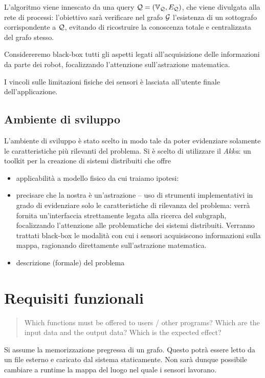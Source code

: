 \documentclass{llncs}
\begin{document}
L'algoritmo viene innescato da una query $\mathcal{Q} = (\mathbb{V}_{\mathcal{Q}}, E_{\mathcal{Q}})$, 
che viene divulgata alla rete di processi: l'obiettivo sarà verificare
nel grafo $\mathcal{G}$ l'esistenza di un sottografo corrispondente a $\mathcal{Q}$,
evitando di ricostruire la conoscenza totale e centralizzata del
grafo stesso.

Considereremo black-box tutti gli aspetti legati all'acquisizione delle informazioni 
da parte dei robot, focalizzando l'attenzione sull'astrazione matematica.

I vincoli sulle limitazioni fisiche dei sensori è lasciata all'utente finale dell'applicazione.
\subsection{Ambiente di sviluppo}
L'ambiente di sviluppo è stato scelto in modo tale da poter evidenziare solamente le caratteristiche più rilevanti del problema. Si è scelto di utilizzare il \emph{Akka}: un toolkit per la creazione di sistemi distribuiti che offre 


\begin{itemize}
\item applicabilità a modello fisico da cui traiamo ipotesi:
\item precisare che la nostra è un'astrazione -- uso di strumenti
  implementativi in grado di evidenziare solo le caratteristiche
  di rilevanza del problema: verrà fornita un'interfaccia strettamente
  legata alla ricerca del subgraph, focalizzando l'attenzione
  alle problematiche dei sistemi distribuiti.
  Verranno trattati black-box le modalità con cui i sensori
  acquisiscono informazioni sulla mappa, ragionando direttamente
  sull'astrazione matematica.
\item descrizione (formale) del problema
\end{itemize}




\section{Requisiti funzionali}
\label{sec:func-req}
\begin{quote}
  Which functions must be offered to users / other programs?
  Which are the input data and the output data?
  Which is the expected effect?
\end{quote}

Si assume la memorizzazione pregressa di un grafo.
Questo potrà essere letto da un file esterno e caricato dal sistema
staticamente. Non sarà dunque possibile cambiare a runtime la mappa
del luogo nel quale i sensori lavorano.
\end{document}
